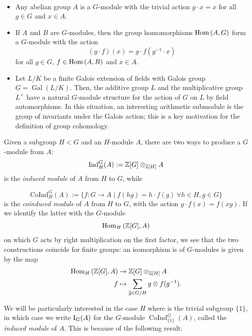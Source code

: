 \documentclass[a4paper, oneside]{memoir}
\begin{document}
\begin{example}[$G$-modules]\
    \begin{itemize}
        \item Any abelian group $A$ is a $G$-module with the trivial action $g\cdot x=x$ for all $g\in G$ and $x\in A$.
        \item If $A$ and $B$ are $G$-modules, then the group homomorphisms $\operatorname{Hom}{(A,G)}$ form a $G$-module with the action
              \[
                  (g\cdot f)(x)=g\cdot f(g^{-1}\cdot x)
              \]
              for all $g\in G$, $f\in\operatorname{Hom}{(A,B)}$ and $x\in A$.
        \item Let $L / K$ be a finite Galois extension of fields with Galois group $G=\operatorname{Gal}{(L / K)}$. Then, the additive group $L$ and the multiplicative group $L^\times$ have a natural $G$-module structure for the action of $G$ on $L$ by field automorphisms. In this situation, an interesting arithmetic submodule is the group of invariants under the Galois action; this is a key motivation for the definition of group cohomology.
    \end{itemize}
\end{example}


Given a subgroup $H<G$ and an $H$-module $A$, there are two ways to produce a $G$-module from $A$:
\[
    \mathrm{Ind}^G_H{(A)}:=\mathbb{Z}[G]\otimes_{\mathbb{Z}[H]}{A}
\]
is the \textit{induced module} of $A$ from $H$ to $G$, while

\[
    \mathrm{CoInd}^G_H{(A)}:=\{f:G\to A \mid f(hg)=h\cdot f(g) ~\forall h\in H, g\in G\}
\]
is the \textit{coinduced module} of $A$ from $H$ to $G$, with the action $g \cdot f(x)=f(xg)$. If we identify the latter with the $G$-module
\[
    \operatorname{Hom}_H{(\mathbb{Z}[G],A)}
\]
on which $G$ acts by right multiplication on the first factor, we see that the two constructions coincide for finite groups: an isomorphism is of $G$-modules is given by the map
\begin{align}
    \operatorname{Hom}_H{(\mathbb{Z}[G],A)} & \to \mathbb{Z}[G]\otimes_{\mathbb{Z}[H]}{A}                                \nonumber        \\
    f                 & \mapsto \sum_{\overline{g} \in G / H}{g\otimes f(g^{-1})}\label{eq:IndIso}.
\end{align}

We will be particularly interested in the case $H$ where is the trivial subgroup $\{1\}$, in which case we write $\mathrm{I}_{G}(A)$ for the $G$-module $\operatorname{CoInd}^G_{\{1\}}{(A)}$, called the \textit{induced module} of $A$. This is because of the following result:
\end{document}
